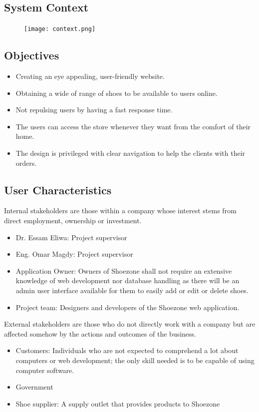\documentclass[12pt]{article}
\begin{document}
\subsection{System Context}
 \begin{figure}[h]
\centering
\texttt{[image: context.png]}
\end{figure}
\subsection{Objectives}
\begin{itemize}
 \item Creating an eye appealing, user-friendly website.
 \item Obtaining a wide of range of shoes to be available to users online.
 \item Not repulsing users by having a fast response time.
 \item The users can access the store whenever they want from the comfort of their home.
 \item The design is privileged with clear navigation to help the clients with their orders.
\end{itemize}

\subsection{ User Characteristics}
Internal stakeholders are those within a company whose interest stems from direct employment, ownership or investment.
\begin{itemize}
\item Dr. Essam Eliwa: Project supervisor
\item Eng. Omar Magdy: Project supervisor
\item Application Owner: Owners of Shoezone shall not require an extensive knowledge of web development nor database handling as there will be an admin user interface available for them to easily add or edit or delete shoes.
\item Project team: Designers and developers of the Shoezone web application.
\end{itemize}
External stakeholders are those who do not directly work with a company but are affected somehow by the actions and outcomes of the business.
\begin{itemize}
\item Customers: Individuals who are not expected to comprehend a lot about computers or web development; the only skill needed is to be capable of using computer software.
\item Government
\item Shoe supplier: A supply outlet that provides products to Shoezone
\end{itemize}
\end{document}
